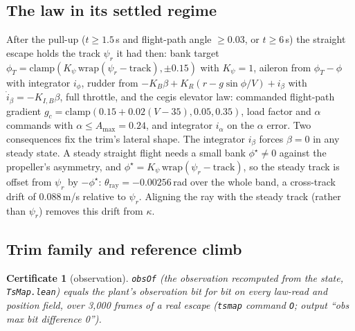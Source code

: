 \documentclass[11pt]{article}
\newtheorem{cert}{Certificate}
\begin{document}
\subsection{The law in its settled regime}

After the pull-up ($t \ge 1.5$\,s and flight-path angle $\ge 0.03$, or $t \ge 6$\,s) the straight escape holds the track $\psi_r$ it had then: bank target $\phi_T = \mathrm{clamp}(K_\psi\,\mathrm{wrap}(\psi_r - \text{track}), \pm 0.15)$ with $K_\psi = 1$, aileron from $\phi_T - \phi$ with integrator $i_\phi$, rudder from $-K_B\beta + K_R(r - g\sin\phi/V) + i_\beta$ with $\dot i_\beta = -K_{I,B}\beta$, full throttle, and the cegis elevator law: commanded flight-path gradient $g_c = \mathrm{clamp}(0.15 + 0.02(V - 35), 0.05, 0.35)$, load factor and $\alpha$ commands with $\alpha \le A_{\max} = 0.24$, and integrator $i_\alpha$ on the $\alpha$ error.
Two consequences fix the trim's lateral shape. The integrator $i_\beta$ forces $\beta = 0$ in any steady state. A steady straight flight needs a small bank $\phi^\star \ne 0$ against the propeller's asymmetry, and $\phi^\star = K_\psi\,\mathrm{wrap}(\psi_r - \text{track})$, so the steady track is offset from $\psi_r$ by $-\phi^\star$: $\theta_{\mathrm{ray}} = -0.00256$\,rad over the whole band, a cross-track drift of $0.088$\,m/s relative to $\psi_r$. Aligning the ray with the steady track (rather than $\psi_r$) removes this drift from $\kappa$.

\subsection{Trim family and reference climb}\label{sec:ref}

\begin{cert}[observation]\label{cert:obs}
\texttt{obsOf} (the observation recomputed from the state, \texttt{TsMap.lean}) equals the plant's observation bit for bit on every law-read and position field, over 3{,}000 frames of a real escape (\texttt{tsmap} command \texttt{O}; output ``obs max bit difference 0'').
\end{cert}
\end{document}
